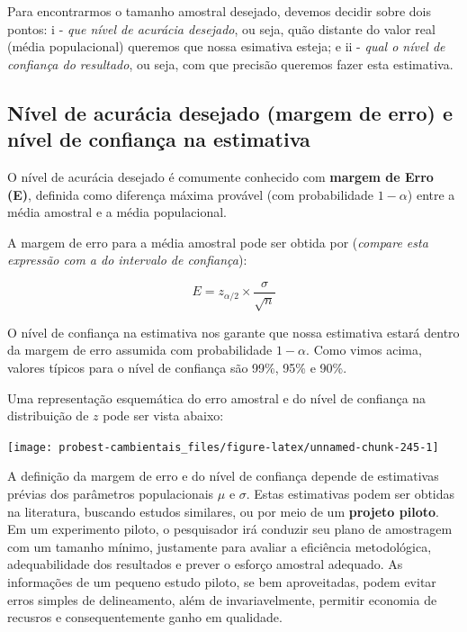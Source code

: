 \documentclass[
]{book}
\begin{document}
Para encontrarmos o tamanho amostral desejado, devemos decidir sobre dois pontos: i - \emph{que nível de acurácia desejado}, ou seja, quão distante do valor real (média populacional) queremos que nossa esimativa esteja; e ii - \emph{qual o nível de confiança do resultado}, ou seja, com que precisão queremos fazer esta estimativa.

\hypertarget{nuxedvel-de-acuruxe1cia-desejado-margem-de-erro-e-nuxedvel-de-confianuxe7a-na-estimativa}{%
\subsection{Nível de acurácia desejado (margem de erro) e nível de confiança na estimativa}\label{nuxedvel-de-acuruxe1cia-desejado-margem-de-erro-e-nuxedvel-de-confianuxe7a-na-estimativa}}

O nível de acurácia desejado é comumente conhecido com \textbf{margem de Erro (E)}, definida como diferença máxima provável (com probabilidade \(1-\alpha\)) entre a média amostral e a média populacional.

A margem de erro para a média amostral pode ser obtida por (\emph{compare esta expressão com a do intervalo de confiança}):

\[E = z_{\alpha/2} \times \frac{\sigma}{\sqrt{n}}\]

O nível de confiança na estimativa nos garante que nossa estimativa estará dentro da margem de erro assumida com probabilidade \(1-\alpha\). Como vimos acima, valores típicos para o nível de confiança são 99\%, 95\% e 90\%.

Uma representação esquemática do erro amostral e do nível de confiança na distribuição de \(z\) pode ser vista abaixo:

\begin{center}\texttt{[image: probest-cambientais\_files/figure-latex/unnamed-chunk-245-1]} \end{center}

A definição da margem de erro e do nível de confiança depende de estimativas prévias dos parâmetros populacionais \(\mu\) e \(\sigma\). Estas estimativas podem ser obtidas na literatura, buscando estudos similares, ou por meio de um \textbf{projeto piloto}. Em um experimento piloto, o pesquisador irá conduzir seu plano de amostragem com um tamanho mínimo, justamente para avaliar a eficiência metodológica, adequabilidade dos resultados e prever o esforço amostral adequado. As informações de um pequeno estudo piloto, se bem aproveitadas, podem evitar erros simples de delineamento, além de invariavelmente, permitir economia de recusros e consequentemente ganho em qualidade.
\end{document}
